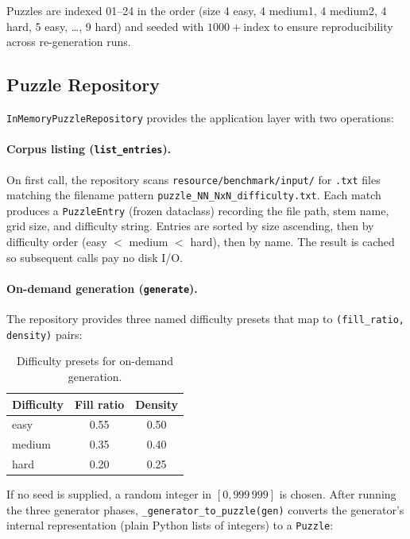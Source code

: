 Puzzles are indexed 01–24 in the order (size 4 easy, 4 medium1, 4 medium2,
4 hard, 5 easy, \ldots, 9 hard) and seeded with $1000 + \text{index}$
to ensure reproducibility across re-generation runs.

\subsection{Puzzle Repository}
\label{sec:repository}

\texttt{InMemoryPuzzleRepository} provides the application layer with two
operations:

\paragraph{Corpus listing (\texttt{list\_entries}).}
On first call, the repository scans \texttt{resource/benchmark/input/} for
\texttt{.txt} files matching the filename pattern
\texttt{puzzle\_NN\_NxN\_difficulty.txt}.
Each match produces a \texttt{PuzzleEntry} (frozen dataclass) recording the
file path, stem name, grid size, and difficulty string.
Entries are sorted by size ascending, then by difficulty order (easy $<$
medium $<$ hard), then by name.
The result is cached so subsequent calls pay no disk I/O.

\paragraph{On-demand generation (\texttt{generate}).}
The repository provides three named difficulty presets that map to
\texttt{(fill\_ratio, density)} pairs:

\begin{table}[h]
  \centering
  \caption{Difficulty presets for on-demand generation.}
  \label{tab:difficulty_presets}
  \begin{tabular}{lcc}
    \toprule
    Difficulty & Fill ratio & Density \\
    \midrule
    easy   & 0.55 & 0.50 \\
    medium & 0.35 & 0.40 \\
    hard   & 0.20 & 0.25 \\
    \bottomrule
  \end{tabular}
\end{table}

If no seed is supplied, a random integer in $[0, 999\,999]$ is chosen.
After running the three generator phases,
\texttt{\_generator\_to\_puzzle(gen)} converts the generator's internal
representation (plain Python lists of integers) to a \texttt{Puzzle}:

